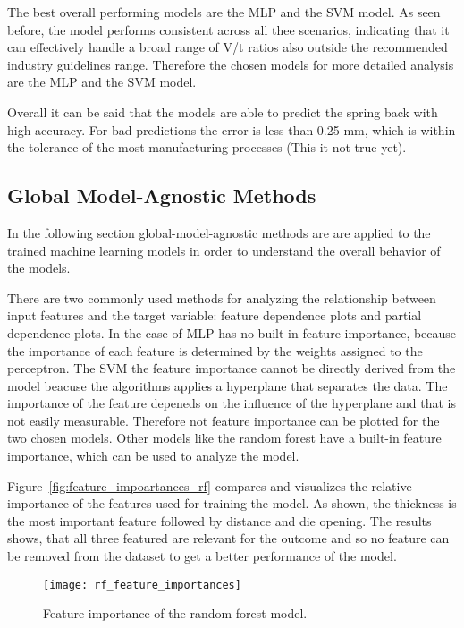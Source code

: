 The best overall performing models are the \ac{MLP} and the \ac{SVM} model.
As seen before, the model performs consistent across all thee scenarios, indicating that it can
effectively handle a broad range of V/t ratios also outside the recommended industry guidelines
range.
Therefore the chosen models for more detailed analysis are the \ac{MLP} and the \ac{SVM} model.

Overall it can be said that the models are able to predict the spring back with high accuracy.
For bad predictions the error is less than 0.25 mm, which is within the tolerance of the
most manufacturing processes (This it not true yet).


\subsection*{Global Model-Agnostic Methods}
In the following section global-model-agnostic methods are are applied to the trained machine
learning models in order to understand the overall behavior of the models.

There are two commonly used methods for analyzing the relationship between input features and the
target variable: feature dependence plots and partial dependence plots.
In the case of \ac{MLP} has no built-in feature importance, because the importance of each
feature is determined by the weights assigned to the perceptron.
The \ac{SVM} the feature importance cannot be directly derived from the model beacuse the
algorithms applies a hyperplane that separates the data.
The importance of the feature depeneds on the influence of the hyperplane and that is not easily
measurable.
Therefore not feature importance can be plotted for the two chosen models. Other models like the
random forest have a built-in feature importance, which can be used to analyze the model.

Figure~\ref{fig:feature_impoartances_rf} compares and visualizes the relative
importance of the features used for training the model.
As shown, the thickness is the most important feature followed by distance
and die opening.
The results shows, that all three featured are relevant for the outcome and so no feature can be
removed from the dataset to get a better performance of the model.

\begin{figure}[H]
    \begin{tcolorbox}[arc=0pt,boxrule=0.5pt]
        \centering
        \texttt{[image: rf\_feature\_importances]}
    \end{tcolorbox}
    \caption{Feature importance of the random forest model.}
    \label{fig:feature-importances-rf}
\end{figure}


